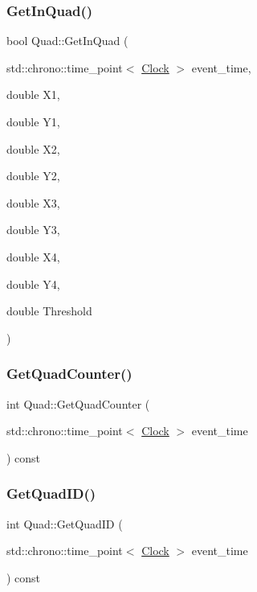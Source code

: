 \subsubsection{\texorpdfstring{Get\+In\+Quad()}{GetInQuad()}}
{\footnotesize\ttfamily bool Quad\+::\+Get\+In\+Quad (\begin{DoxyParamCaption}\item[{std\+::chrono\+::time\+\_\+point$<$ \mbox{\hyperlink{universe_8h_a0ef8d951d1ca5ab3cfaf7ab4c7a6fd80}{Clock}} $>$}]{event\+\_\+time,  }\item[{double}]{X1,  }\item[{double}]{Y1,  }\item[{double}]{X2,  }\item[{double}]{Y2,  }\item[{double}]{X3,  }\item[{double}]{Y3,  }\item[{double}]{X4,  }\item[{double}]{Y4,  }\item[{double}]{Threshold }\end{DoxyParamCaption})\hspace{0.3cm}{\ttfamily [inline]}}

\mbox{\label{classQuad_a56ac193fa18af6ec468463cc16588cc1}} 
\subsubsection{\texorpdfstring{Get\+Quad\+Counter()}{GetQuadCounter()}}
{\footnotesize\ttfamily int Quad\+::\+Get\+Quad\+Counter (\begin{DoxyParamCaption}\item[{std\+::chrono\+::time\+\_\+point$<$ \mbox{\hyperlink{universe_8h_a0ef8d951d1ca5ab3cfaf7ab4c7a6fd80}{Clock}} $>$}]{event\+\_\+time }\end{DoxyParamCaption}) const\hspace{0.3cm}{\ttfamily [inline]}}

\mbox{\label{classQuad_aba78e3b63f568529fcae1cfa6c3c54bf}} 
\subsubsection{\texorpdfstring{Get\+Quad\+I\+D()}{GetQuadID()}}
{\footnotesize\ttfamily int Quad\+::\+Get\+Quad\+ID (\begin{DoxyParamCaption}\item[{std\+::chrono\+::time\+\_\+point$<$ \mbox{\hyperlink{universe_8h_a0ef8d951d1ca5ab3cfaf7ab4c7a6fd80}{Clock}} $>$}]{event\+\_\+time }\end{DoxyParamCaption}) const\hspace{0.3cm}{\ttfamily [inline]}}

